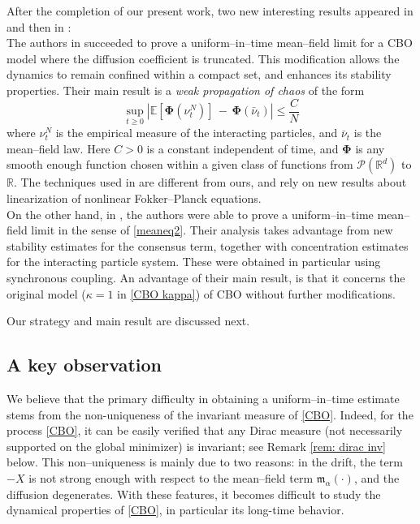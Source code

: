 \documentclass[12pt]{amsart}
\numberwithin{equation}{section}
\begin{document}
After the completion of our present work, two new interesting results appeared in \cite{bayraktar2025uniform} and then in \cite{gerber2025uniform}: \\
\textbullet\; The authors in \cite{bayraktar2025uniform} 
succeeded to prove a uniform--in--time mean--field limit for a CBO model where the diffusion coefficient is truncated. This modification allows the dynamics to remain confined within a compact set, and enhances its stability properties. Their main result \cite[Theorem 2.6]{bayraktar2025uniform} is a \textit{weak propagation of chaos} of the form 
\begin{equation*}
    \sup\limits_{t\geq 0} \left| \mathbb{E}\left[\mathbf{\Phi}(\nu^{N}_t)\right] \,-\, \mathbf{\Phi}(\bar{\nu}_{t}) \right| \leq \frac{C}{N}
\end{equation*}
where $\nu^{N}_{t}$ is the empirical measure of the interacting particles, and $\bar{\nu}_{t}$ is the mean--field law. Here  $C>0$ is a constant independent of time, and $\mathbf{\Phi}$ is any smooth enough function chosen within a given class of functions from $\mathscr{P}(\mathbb{R}^{d})$ to $\mathbb{R}$. The techniques used in \cite{bayraktar2025uniform} are different from ours, and rely on new results about linearization of nonlinear Fokker--Planck equations. \\
\textbullet\; On the other hand, in  \cite[Theorem 2.1]{gerber2025uniform}, the authors were able to prove a uniform--in--time mean--field limit in the sense of \eqref{meaneq2}. Their analysis takes advantage from new stability estimates for the consensus term, together with concentration estimates for the interacting particle system. These were obtained in particular using synchronous coupling. An advantage of their main result, is that it concerns the original model ($\kappa=1$ in \eqref{CBO kappa}) of CBO without further modifications. 

Our strategy and main result are discussed next. 


\subsection{A key observation}

We believe that the primary difficulty in obtaining a uniform--in--time estimate stems from the non-uniqueness of the invariant measure of \eqref{CBO}. Indeed, for the process \eqref{CBO}, it can be easily verified that  any Dirac measure (not necessarily supported on the global minimizer) is invariant; see Remark \ref{rem: dirac inv} below. This non--uniqueness is mainly due to two reasons: 
in the drift, the term $-X$ is not strong enough with respect to the mean--field term $\mathfrak{m}_{\alpha}(\cdot)$, and the diffusion degenerates. With these features, it becomes difficult to study the dynamical properties of \eqref{CBO}, in particular its long-time behavior. 
\end{document}
